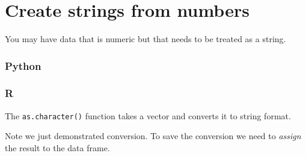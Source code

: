 \documentclass[
]{book}
\newenvironment{Shaded}{\begin{snugshade}}{\end{snugshade}}
\newcommand{\CommentTok}[1]{\textcolor[rgb]{0.56,0.35,0.01}{\textit{#1}}}
\newcommand{\ConstantTok}[1]{\textcolor[rgb]{0.00,0.00,0.00}{#1}}
\newcommand{\DecValTok}[1]{\textcolor[rgb]{0.00,0.00,0.81}{#1}}
\newcommand{\ErrorTok}[1]{\textcolor[rgb]{0.64,0.00,0.00}{\textbf{#1}}}
\newcommand{\FunctionTok}[1]{\textcolor[rgb]{0.00,0.00,0.00}{#1}}
\newcommand{\NormalTok}[1]{#1}
\newcommand{\OtherTok}[1]{\textcolor[rgb]{0.56,0.35,0.01}{#1}}
\newcommand{\SpecialCharTok}[1]{\textcolor[rgb]{0.00,0.00,0.00}{#1}}
\newcommand{\StringTok}[1]{\textcolor[rgb]{0.31,0.60,0.02}{#1}}
\begin{document}
\begin{Shaded}
\end{Shaded}

\hypertarget{create-strings-from-numbers}{%
\section{Create strings from numbers}\label{create-strings-from-numbers}}

You may have data that is numeric but that needs to be treated as a string.

\hypertarget{python-18}{%
\subsubsection*{Python}\label{python-18}}

\hypertarget{r-18}{%
\subsubsection*{R}\label{r-18}}

The \texttt{as.character()} function takes a vector and converts it to string format.

\begin{Shaded}
\end{Shaded}

Note we just demonstrated conversion. To save the conversion we need to \emph{assign} the result to the data frame.

\begin{Shaded}
\end{Shaded}
\end{document}
